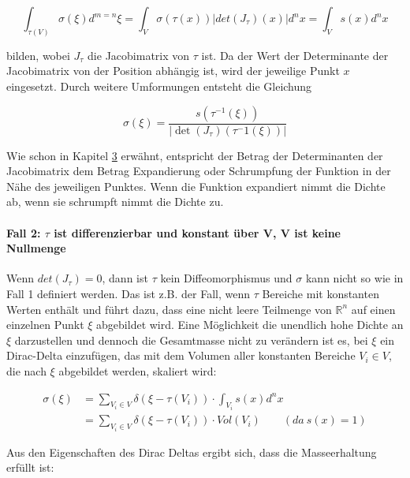 \documentclass[a4paper,fontsize=12pt,toc=bib,halfparskip,ngerman]{scrartcl}
\begin{document}
\begin{equation}
\int_{\tau(V)}\sigma(\xi)d^{m=n}\xi = \int_{V}\sigma(\tau(x))|det(J_\tau)(x)|d^nx = \int_{V}s(x)d^nx
\end{equation}

bilden, wobei $J_\tau$ die Jacobimatrix von $\tau$ ist. Da der Wert der Determinante der Jacobimatrix von der Position abh\"angig ist, wird der jeweilige Punkt $x$ eingesetzt. Durch weitere Umformungen entsteht die Gleichung

\begin{equation}
\sigma(\xi) = \frac{s(\tau^{-1}(\xi))}{|\det(J_\tau)(\tau^-1(\xi))|}
\label{Case1Formula}
\end{equation}

Wie schon in Kapitel \hyperref[sec:Grundlagen]{3} erw\"ahnt, entspricht der Betrag der Determinanten der Jacobimatrix dem Betrag Expandierung oder Schrumpfung der Funktion in der N\"ahe des jeweiligen Punktes. Wenn die Funktion expandiert nimmt die Dichte ab, wenn sie schrumpft nimmt die Dichte zu.

\paragraph{Fall 2: $\tau$ ist differenzierbar und konstant \"uber V, V ist keine Nullmenge}
Wenn $det(J_\tau) = 0$, dann ist $\tau$ kein Diffeomorphismus und $\sigma$ kann nicht so wie in Fall 1 definiert werden. Das ist z.B. der Fall, wenn $\tau$ Bereiche mit konstanten Werten enth\"alt und f\"uhrt dazu, dass eine nicht leere Teilmenge von $\mathbb{R}^n$ auf einen einzelnen Punkt $\xi$ abgebildet wird. Eine M\"oglichkeit die unendlich hohe Dichte an $\xi$ darzustellen und dennoch die Gesamtmasse nicht zu ver\"andern ist es, bei $\xi$ ein Dirac-Delta einzuf\"ugen, das mit dem Volumen aller konstanten Bereiche $V_i \in V$, die nach $\xi$ abgebildet werden, skaliert wird:

\begin{equation}
\begin{split}
\sigma(\xi) &= \sum_{V_i \in V}\delta(\xi - \tau(V_i)) \cdot \int_{V_i}s(x)d^nx\\
&= \sum_{V_i \in V}\delta(\xi - \tau(V_i)) \cdot Vol(V_i)~~~~~~~~~(da~s(x) = 1)
\end{split}
\label{DiracTimesVolume}
\end{equation}

Aus den Eigenschaften des Dirac Deltas ergibt sich, dass die Masseerhaltung erf\"ullt ist:
\end{document}
